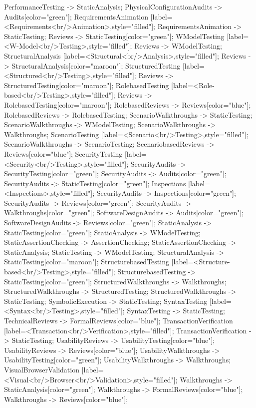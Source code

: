 \documentclass{article}
\begin{document}
{PerformanceTesting -> StaticAnalysis;
PhysicalConfigurationAudits -> Audits[color="green"];
RequirementsAnimation [label=<Requirements<br/>Animation>,style="filled"];
RequirementsAnimation -> StaticTesting;
Reviews -> StaticTesting[color="green"];
WModelTesting [label=<W-Model<br/>Testing>,style="filled"];
Reviews -> WModelTesting;
StructuralAnalysis [label=<Structural<br/>Analysis>,style="filled"];
Reviews -> StructuralAnalysis[color="maroon"];
StructuredTesting [label=<Structured<br/>Testing>,style="filled"];
Reviews -> StructuredTesting[color="maroon"];
RolebasedTesting [label=<Role-based<br/>Testing>,style="filled"];
Reviews -> RolebasedTesting[color="maroon"];
RolebasedReviews -> Reviews[color="blue"];
RolebasedReviews -> RolebasedTesting;
ScenarioWalkthroughs -> StaticTesting;
ScenarioWalkthroughs -> WModelTesting;
ScenarioWalkthroughs -> Walkthroughs;
ScenarioTesting [label=<Scenario<br/>Testing>,style="filled"];
ScenarioWalkthroughs -> ScenarioTesting;
ScenariobasedReviews -> Reviews[color="blue"];
SecurityTesting [label=<Security<br/>Testing>,style="filled"];
SecurityAudits -> SecurityTesting[color="green"];
SecurityAudits -> Audits[color="green"];
SecurityAudits -> StaticTesting[color="green"];
Inspections [label=<Inspections>,style="filled"];
SecurityAudits -> Inspections[color="green"];
SecurityAudits -> Reviews[color="green"];
SecurityAudits -> Walkthroughs[color="green"];
SoftwareDesignAudits -> Audits[color="green"];
SoftwareDesignAudits -> Reviews[color="green"];
StaticAnalysis -> StaticTesting[color="green"];
StaticAnalysis -> WModelTesting;
StaticAssertionChecking -> AssertionChecking;
StaticAssertionChecking -> StaticAnalysis;
StaticTesting -> WModelTesting;
StructuralAnalysis -> StaticTesting[color="maroon"];
StructurebasedTesting [label=<Structure-based<br/>Testing>,style="filled"];
StructurebasedTesting -> StaticTesting[color="green"];
StructuredWalkthroughs -> Walkthroughs;
StructuredWalkthroughs -> StructuredTesting;
StructuredWalkthroughs -> StaticTesting;
SymbolicExecution -> StaticTesting;
SyntaxTesting [label=<Syntax<br/>Testing>,style="filled"];
SyntaxTesting -> StaticTesting;
TechnicalReviews -> FormalReviews[color="blue"];
TransactionVerification [label=<Transaction<br/>Verification>,style="filled"];
TransactionVerification -> StaticTesting;
UsabilityReviews -> UsabilityTesting[color="blue"];
UsabilityReviews -> Reviews[color="blue"];
UsabilityWalkthroughs -> UsabilityTesting[color="green"];
UsabilityWalkthroughs -> Walkthroughs;
VisualBrowserValidation [label=<Visual<br/>Browser<br/>Validation>,style="filled"];
Walkthroughs -> StaticAnalysis[color="green"];
Walkthroughs -> FormalReviews[color="blue"];
Walkthroughs -> Reviews[color="blue"];

}
\end{document}
